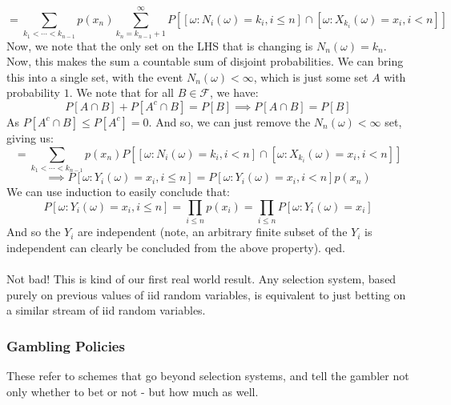 \documentclass[12pt,a4paper]{article}
\newcommand{\1}[1]{\mathbbm{1}\left\{ #1 \right\}}
\newcommand{\fcal}{\mathcal{F}}
\begin{document}
$$
	= \sum_{k_1 < \cdots < k_{n-1}} p(x_n)\sum_{k_n = k_{n-1} + 1}^\infty 
	P\left[\left[\omega : N_i(\omega) = k_i, i \leq n\right] \cap 
	\left[\omega: X_{k_i}(\omega) = x_i, i < n\right]\right]
$$
Now, we note that the only set on the LHS that is changing is $N_n(\omega) = k_n$. Now, this makes the sum a countable sum of disjoint probabilities. We can bring this into a single set, with the event $N_n(\omega) < \infty$, which is just some set $A$ with probability $1$. We note that for all $B \in \fcal$, we have:
$$
	P[A \cap B] + P[A^c \cap B] = P[B] \implies
	P[A \cap B] = P[B]
$$
As $P[A^c \cap B] \leq P[A^c] = 0$. And so, we can just remove the $N_n(\omega) < \infty$ set, giving us:
$$
	= \sum_{k_1 < \cdots < k_{n-1}} p(x_n) 
	P\left[\left[\omega : N_i(\omega) = k_i, i < n\right] \cap 
	\left[\omega: X_{k_i}(\omega) = x_i, i < n\right]\right]
$$
$$
	\implies  P\left[\omega : Y_i(\omega) = x_i, i \leq n\right] = P[\omega : Y_i(\omega) = x_i, i < n] p(x_n)
$$
We can use induction to easily conclude that:
$$
	P\left[\omega : Y_i(\omega) = x_i, i \leq n\right] = \prod_{i \leq n} p(x_i) = 
	\prod_{i \leq n} P\left[\omega : Y_i(\omega) = x_i\right]
$$
And so the $Y_i$ are independent (note, an arbitrary finite subset of the $Y_i$ is independent can clearly be concluded from the above property). qed.
\\\\
Not bad! This is kind of our first real world result. Any selection system, based purely on previous values of iid random variables, is equivalent to just betting on a similar stream of iid random variables.

\subsubsection{Gambling Policies}
These refer to schemes that go beyond selection systems, and tell the gambler not only whether to bet or not - but how much as well.
\end{document}
